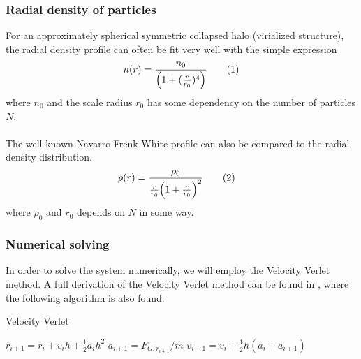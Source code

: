 \documentclass{article}
\newcommand\numberthis{\addtocounter{equation}{1}\tag{\theequation}}
\begin{document}
\subsubsection{Radial density of particles}
For an approximately spherical symmetric collapsed halo (virialized structure), the radial density profile can often be fit very well with the simple expression
\begin{align*}
  n(r) = \frac{n_0}{\Big(1+(\frac{r}{r_0})^4\Big)} \numberthis\label{eq:radial_dist}
\end{align*}
where $n_0$ and the scale radius $r_0$ has some dependency on the number of particles $N$.\\\\
The well-known Navarro-Frenk-White profile can also be compared to the radial density distribution.
\begin{align*}
  \rho(r) &= \frac{\rho_0}{\frac{r}{r_0}\Big(1+\frac{r}{r_0}\Big)^2}\numberthis\label{eq:NFW}
\end{align*}
where $\rho_0$ and $r_0$ depends on $N$ in some way.
\subsubsection{Numerical solving}
In order to solve the system numerically, we will employ the Velocity Verlet method. A full derivation of the Velocity Verlet method can be found in \cite{Github3}, where the following algorithm is also found.
\begin{algorithm}[H]
\small
\caption{Velocity Verlet}\label{alg:VelVerlet}
\begin{algorithmic}[1]
\State $r_{i+1} = r_i + v_i h + \frac{1}{2} a_i h^2$
\State $a_{i+1} = F_{G, r_{i+1}}/m$
\State $v_{i+1} = v_i + \frac{1}{2} h (a_i + a_{i+1})$
\EndFor
\end{algorithmic}
\end{algorithm}
\end{document}
